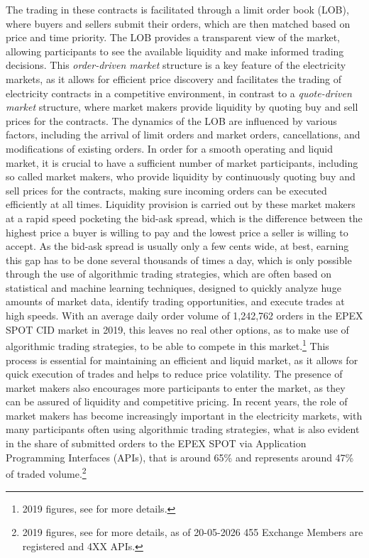 \documentclass[12pt,a4paper]{cau_thesis}
\begin{document}
The trading in these contracts is facilitated through a limit order
book (LOB), where buyers and sellers submit their orders, which are
then matched based on price and time priority. The LOB provides a
transparent view of the market, allowing participants to see the
available liquidity and make informed trading decisions. This
\textit{order-driven market} structure is a key feature of the
electricity markets, as it allows for efficient price discovery and
facilitates the trading of electricity contracts in a competitive
environment, in contrast to a \textit{quote-driven market} structure,
where market makers provide liquidity by quoting buy and sell prices
for the contracts. The dynamics of the LOB are influenced by various
factors, including the arrival of limit orders and market orders,
cancellations, and modifications of existing orders. In order for a
smooth operating and liquid market, it is crucial to have a
sufficient number of market participants, including so called market
makers, who provide liquidity by continuously quoting buy and sell
prices for the contracts, making sure incoming orders can be executed
efficiently at all times. Liquidity provision is carried out by these
market makers at a rapid speed pocketing the bid-ask spread, which is
the difference between the highest price a buyer is willing to pay
and the lowest price a seller is willing to accept. As the bid-ask
spread is usually only a few cents wide, at best, earning this gap
has to be done several thousands of times a day, which is only
possible through the use of algorithmic trading strategies, which are
often based on statistical and machine learning techniques, designed
to quickly analyze huge amounts of market data, identify trading
opportunities, and execute trades at high speeds. With an average
daily order volume of 1,242,762 orders in the EPEX SPOT CID market in
2019, this leaves no real other options, as to make use of
algorithmic trading strategies, to be able to compete in this
market.\footnote{2019 figures, see \cite{epexspot_annual_report_2019}
    for more details.} This process is essential for maintaining an
efficient and liquid market, as it allows for quick execution of
trades and helps to reduce price volatility. The presence of market
makers also encourages more participants to enter the market, as they
can be assured of liquidity and competitive pricing. In recent years,
the role of market makers has become increasingly important in the
electricity markets, with many participants often using algorithmic
trading strategies, what is also evident in the share of submitted
orders to the EPEX SPOT via Application Programming Interfaces
(APIs), that is around 65\% and represents around 47\% of traded
volume.\footnote{2019 figures, see \cite{epexspot_annual_report_2019}
    for more details, as of 20-05-2026 455 Exchange Members are
    registered and 4XX APIs.}
\end{document}
